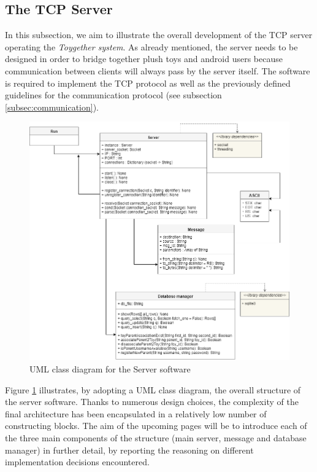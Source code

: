 \newpage
\subsection{The TCP Server}
\label{subsec:server} 

In this subsection, we aim to illustrate the overall development of the TCP server operating the \textit{Toygether system}. As already mentioned, the server needs to be designed in order to bridge together plush toys and android users because communication between clients will always pass by the server itself. The software is required to implement the TCP protocol as well as the previously defined guidelines for the communication protocol (see subsection \ref{subsec:communication}).

\begin{figure}[ht]
    \centering
    \includegraphics[scale=0.5]{images/SE_UML_server.png}
    \caption{UML class diagram for the Server software}
    \label{fig:SE_uml_server}
\end{figure}

Figure \ref{fig:SE_uml_server} illustrates, by adopting a UML class diagram, the overall structure of the server software. Thanks to numerous design choices, the complexity of the final architecture has been encapsulated in a relatively low number of constructing blocks. The aim of the upcoming pages will be to introduce each of the three main components of the structure (main server, message and database manager) in further detail, by reporting the reasoning on different implementation decisions encountered.

